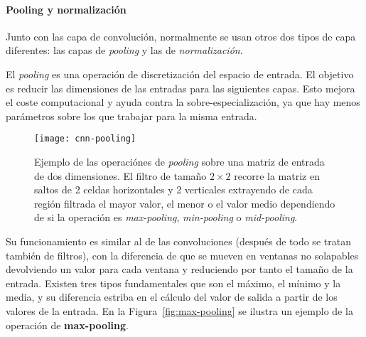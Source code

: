 \paragraph{Pooling y normalización}

Junto con las capa de convolución, normalmente se usan otros dos tipos de capa diferentes: las capas de \textit{pooling} y las de \textit{normalización}.

El \textit{pooling} es una operación de discretización del espacio de entrada. El objetivo es reducir las dimensiones de las entradas para las siguientes capas. Esto mejora el coste computacional y ayuda contra la sobre-especialización, ya que hay menos parámetros sobre los que trabajar para la misma entrada.


\begin{figure}[t]
	\centering
	\texttt{[image: cnn-pooling]}
	\caption[Ejemplo de las operaciónes de \textit{pooling}.]{Ejemplo de las operaciónes de \textit{pooling} sobre una matriz de entrada de dos dimensiones. El filtro de tamaño $2 \times 2$ recorre la matriz en saltos de 2 celdas horizontales y 2 verticales extrayendo de cada región filtrada el mayor valor, el menor o el valor medio dependiendo de si la operación es \textit{max-pooling}, \textit{min-pooling} o \textit{mid-pooling}.}
	\label{fig:cnn-pooling}
\end{figure}

Su funcionamiento es similar al de las convoluciones (después de todo se tratan también de filtros), con la diferencia de que se mueven en ventanas no solapables devolviendo un valor para cada ventana y reduciendo por tanto el tamaño de la entrada. Existen tres tipos fundamentales que son el máximo, el mínimo y la media, y su diferencia estriba en el cálculo del valor de salida a partir de los valores de la entrada. En la Figura~\ref{fig:max-pooling} se ilustra un ejemplo de la operación de \textbf{max-pooling}.

